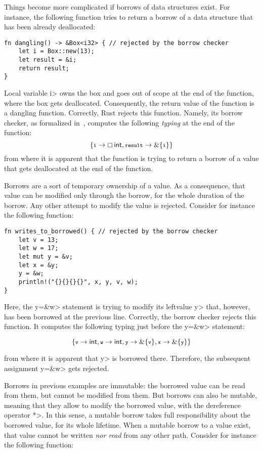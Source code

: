 Things become more complicated if borrows of data structures exist.
For instance, the following function tries to return a borrow of
a data structure that has been already deallocated:

\begin{verbatim}
fn dangling() -> &Box<i32> { // rejected by the borrow checker
    let i = Box::new(13);
    let result = &i;
    return result;
}
\end{verbatim}

\noindent
Local variable \<i> owns the box and goes out of scope at the end of the
function, where the box gets deallocated. Consequently, the return value of
the function is a dangling function. Correctly, Rust rejects this function.
Namely, its borrow checker, as formalized in~\cite{Pearce21}, computes the
following \emph{typing} at the end of the function:
\[
\{\<i>\to\boxtype{\mathsf{int},\<result>\to\borrow\{\<i>\}}\}
\]
from where it is apparent that the function is trying to return a borrow
of a value that gets deallocated at the end of the function.

Borrows are a sort of temporary ownership of a value. As a consequence,
that value can be modified only through the borrow, for the whole
duration of the borrow. Any other attempt to modify the value is rejected.
Consider for instance the following function:

\begin{verbatim}
fn writes_to_borrowed() { // rejected by the borrow checker
    let v = 13;
    let w = 17;
    let mut y = &v;
    let x = &y;
    y = &w;
    println!("{}{}{}{}", x, y, v, w);
}
\end{verbatim}

\noindent
Here, the \<y=\&w> statement is trying to modify its leftvalue \<y>
that, however, has been borrowed at the previous line. Correctly, the borrow
checker rejects this function. It computes the following typing
just before the \<y=\&w> statement:

\[
\{\<v>\to\mathsf{int},\<w>\to\mathsf{int},\<y>\to\borrow\{\<v>\},\<x>\to\borrow\{\<y>\}\}
\]

\noindent
from where it is apparent that \<y> is borrowed there. Therefore,
the subsequent assignment \<y=\&w> gets rejected.

Borrows in previous examples are immutable: the borrowed value can be read
from them, but cannot be modified from them.
But borrows can also be mutable, meaning that they allow to modify the
borrowed value, with the dereference operator \<*>. In this sense,
a mutable borrow takes full responsibility about the borrowed value, for its
whole lifetime. When a mutable borrow to a value exist, that value cannot
be written \emph{nor read} from any other path. Consider for instance
the following function:

